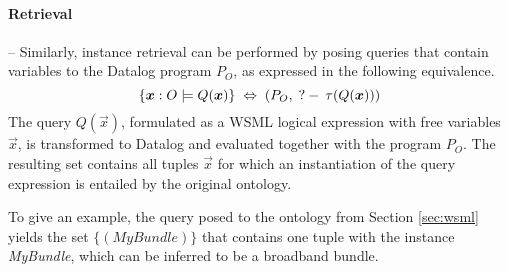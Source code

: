 \paragraph{Retrieval} -- Similarly, instance retrieval can be
performed by posing queries that contain variables to the Datalog
program $P_O$, as expressed in the following equivalence.
\begin{displaymath}
    \{\vec{x} : O \models Q(\vec{x})\} \; \Leftrightarrow \; (P_O, \qury \tau(Q(\vec{x})))
\end{displaymath}
The query $Q(\vec{x})$, formulated as a WSML logical expression
with free variables $\vec{x}$, is transformed to Datalog and
evaluated together with the program $P_O$. The resulting set
contains all tuples $\vec{x}$ for which an instantiation of the
query expression is entailed by the original ontology.

To give an example, the query  
 posed to the ontology from Section
\ref{sec:wsml} yields the set $\{ (\textit{MyBundle}) \}$ that
contains one tuple with the instance \textit{MyBundle}, which can
be inferred to be a broadband bundle.

%
